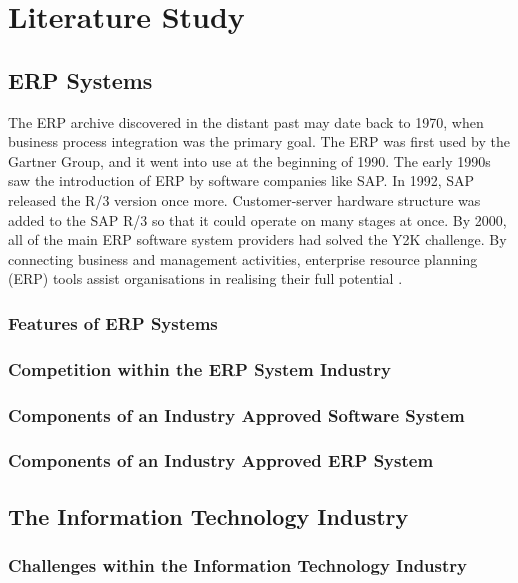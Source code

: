 \chapter{Literature Study}
\section{ERP Systems}
\par{The ERP archive discovered in the distant past may date back to 1970, when business process 
integration was the primary goal. The ERP was first used by the Gartner Group, and it went into 
use at the beginning of 1990. The early 1990s saw the introduction of ERP by software companies 
like SAP. In 1992, SAP released the R/3 version once more. Customer-server hardware structure was
 added to the SAP R/3 so that it could operate on many stages at once. By 2000, all of the main 
 ERP software system providers had solved the Y2K challenge. By connecting business and management 
 activities, enterprise resource planning (ERP) tools assist organisations in realising their full 
 potential \citep{uccakturk2013effects}.}

\subsection{Features of ERP Systems}
\subsection{Competition within the ERP System Industry}
\subsection{Components of an Industry Approved Software System}
\subsection{Components of an Industry Approved ERP System}
\section{The Information Technology Industry}
\subsection{Challenges within the Information Technology Industry}
